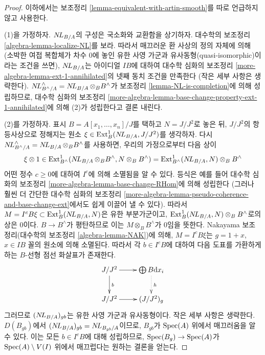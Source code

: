 \begin{proof}
이하에서는 보조정리 \ref{lemma-equivalent-with-artin-smooth}를 따로 언급하지 않고 사용한다.

\medskip\noindent
(1)을 가정하자. $\mathop{N\!L}\nolimits_{B/A}$의 구성은 국소화와 교환함을 상기하자.
대수학의 보조정리 \ref{algebra-lemma-localize-NL}를 보라.
따라서 매끄러운 환 사상의 정의 자체에 의해
(소박한 여접 복합체가 차수 $0$에 놓인 유한 사영 가군과 유사동형(quasi-isomorphic)이라는 조건을 쓰면),
$\mathop{N\!L}\nolimits_{B/A}$는 아이디얼 $IB$에 대하여 대수학 심화의 보조정리
\ref{more-algebra-lemma-ext-1-annihilated}의 넷째 동치 조건을 만족한다
(작은 세부 사항은 생략한다).
$\mathop{N\!L}\nolimits_{B^\wedge/A}^\wedge = \mathop{N\!L}\nolimits_{B/A} \otimes_B B^\wedge$가
보조정리 \ref{lemma-NL-is-completion}에 의해 성립하므로,
대수학 심화의 보조정리 \ref{more-algebra-lemma-base-change-property-ext-1-annihilated}에 의해
(2)가 성립한다고 결론 내린다.

\medskip\noindent
(2)를 가정하자. 표시 $B = A[x_1, \ldots, x_n]/J$를 택하고
$N = J/J^2$로 놓은 뒤, $J/J^2$의 항등사상으로 정해지는 원소
$\xi \in \mathop{\mathrm{Ext}}\nolimits^1_B(\mathop{N\!L}\nolimits_{B/A}, J/J^2)$를 생각하자.
다시 $\mathop{N\!L}\nolimits_{B^\wedge/A}^\wedge = \mathop{N\!L}\nolimits_{B/A} \otimes_B B^\wedge$를 사용하면,
우리의 가정으로부터 다음 상이
$$
\xi \otimes 1 \in
\mathop{\mathrm{Ext}}\nolimits^1_{B^\wedge}(\mathop{N\!L}\nolimits_{B/A} \otimes_B B^\wedge, N \otimes_B B^\wedge) =
\mathop{\mathrm{Ext}}\nolimits^1_{B^\wedge}(\mathop{N\!L}\nolimits_{B/A}, N) \otimes_B B^\wedge
$$
어떤 정수 $c \geq 0$에 대하여 $I^c$에 의해 소멸됨을 알 수 있다.
등식은 예를 들어 대수학 심화의 보조정리 \ref{more-algebra-lemma-base-change-RHom}에 의해 성립한다
(그러나 훨씬 더 간단한 대수학 심화의 보조정리
\ref{more-algebra-lemma-pseudo-coherence-and-base-change-ext}에서도 쉽게 이끌어 낼 수 있다).
따라서 $M = I^cB\xi \subset \mathop{\mathrm{Ext}}\nolimits^1_B(\mathop{N\!L}\nolimits_{B/A}, N)$은 유한 부분가군이고,
$\mathop{\mathrm{Ext}}\nolimits^1_B(\mathop{N\!L}\nolimits_{B/A}, N) \otimes_B B^\wedge$로의 상은 0이다.
$B \to B^\wedge$가 평탄하므로 이는 $M \otimes_B B^\wedge$가 0임을 뜻한다.
Nakayama 보조정리(대수학의 보조정리 \ref{algebra-lemma-NAK})에 의해,
$M = I^cB\xi$는 $g = 1 + x$, $x \in IB$ 꼴의 원소에 의해 소멸된다.
따라서 각 $b \in I^cB$에 대하여 다음 도표를 가환하게 하는
$B$-선형 점선 화살표가 존재한다.
$$
\xymatrix{
J/J^2 \ar[r] \ar[d]^b & \bigoplus B\text{d}x_i \ar@{..>}[d]^h \\
J/J^2 \ar[r] & (J/J^2)_g
}
$$
그러므로 $(\mathop{N\!L}\nolimits_{B/A})_{gb}$는 유한 사영 가군과 유사동형이다.
작은 세부 사항은 생략한다.
$D(B_{gb})$에서 $(\mathop{N\!L}\nolimits_{B/A})_{gb} = \mathop{N\!L}\nolimits_{B_{gb}/A}$이므로,
$B_{gb}$가 $\mathop{\mathrm{Spec}}(A)$ 위에서 매끄러움을 알 수 있다.
이는 모든 $b \in I^cB$에 대해 성립하므로,
$\mathop{\mathrm{Spec}}(B_g) \to \mathop{\mathrm{Spec}}(A)$가 $\mathop{\mathrm{Spec}}(A) \setminus V(I)$ 위에서 매끄럽다는 원하는 결론을 얻는다.
\end{proof}

